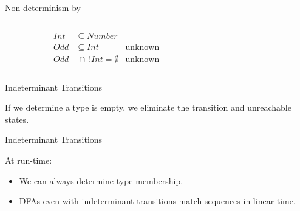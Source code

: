 
\begin{frame}{Non-determinism by }
  \begin{columns}[T]
    \begin{column}{0.35\textwidth}
      \centering
      
      \begin{align*}
        Int&\subseteq Number\\
        Odd&\subseteq Int &\text{unknown}\\
        Odd&~\cap~ !Int = \emptyset &\text{unknown}
      \end{align*}
      \scalebox{0.9}{}%
    \end{column}%
    \begin{column}{0.7\textwidth}
    \end{column}
  \end{columns}
\end{frame}








\newsavebox\classbox
\begin{lrbox}{\classbox}
  \begin{minipage}{5cm}
    
  \end{minipage}
\end{lrbox}

\begin{frame}{Indeterminant Transitions}

  \scalebox{0.8}{}

  If we determine a type is empty, we eliminate the
  transition and unreachable states.
\end{frame}


\begin{frame}{Indeterminant Transitions}

  \scalebox{0.8}{}

  At run-time:
  \begin{itemize}

    \item We can always determine type membership.

    \item DFAs even with indeterminant transitions  match sequences in linear time.  
  \end{itemize}
\end{frame}


